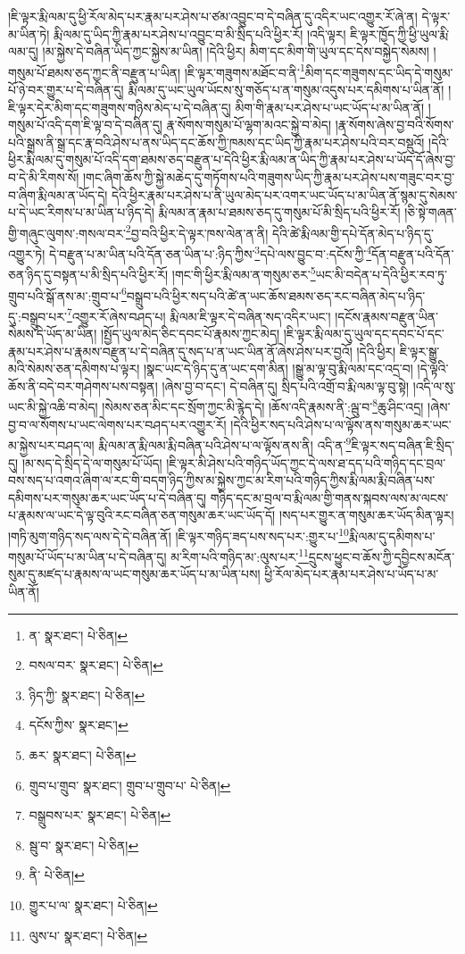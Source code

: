 །ཇི་ལྟར་རྨི་ལམ་དུ་ཕྱི་རོལ་མེད་པར་རྣམ་པར་ཤེས་པ་ཙམ་འབྱུང་བ་དེ་བཞིན་དུ་འདིར་ཡང་འགྱུར་རོ་ཞེ་ན། དེ་ལྟར་མ་ཡིན་ཏེ། རྨི་ལམ་དུ་ཡིད་ཀྱི་རྣམ་པར་ཤེས་པ་འབྱུང་བ་མི་སྲིད་པའི་ཕྱིར་རོ། །འདི་ལྟར། ཇི་ལྟར་ཁྱོད་ཀྱི་ཕྱི་ཡུལ་རྨི་ལམ་དུ། །མ་སྐྱེས་དེ་བཞིན་ཡིད་ཀྱང་སྐྱེས་མ་ཡིན། །དེའི་ཕྱིར། མིག་དང་མིག་གི་ཡུལ་དང་དེས་བསྐྱེད་སེམས། །
གསུམ་པོ་ཐམས་ཅད་ཀྱང་ནི་བརྫུན་པ་ཡིན། །ཇི་ལྟར་གཟུགས་མཐོང་བ་ནི་\footnote{ན་  སྣར་ཐང་།  པེ་ཅིན། }མིག་དང་གཟུགས་དང་ཡིད་དེ་གསུམ་པོ་ཉེ་བར་གྱུར་པ་དེ་བཞིན་དུ། རྨི་ལམ་དུ་ཡང་ཡུལ་ཡོངས་སུ་གཅོད་པ་ན་གསུམ་འདུས་པར་དམིགས་པ་ཡིན་ནོ། །ཇི་ལྟར་དེར་མིག་དང་གཟུགས་གཉིས་མེད་པ་དེ་བཞིན་དུ། མིག་གི་རྣམ་པར་ཤེས་པ་ཡང་ཡོད་པ་མ་ཡིན་ནོ། །གསུམ་པོ་འདི་དག་ཇི་ལྟ་བ་དེ་བཞིན་དུ། རྣ་སོགས་གསུམ་པོ་ལྷག་མའང་སྐྱེ་བ་མེད། །རྣ་སོགས་ཞེས་བྱ་བའི་སོགས་པའི་སྒྲས་ནི་སྒྲ་དང་རྣ་བའི་ཤེས་པ་ནས་ཡིད་དང་ཆོས་ཀྱི་ཁམས་དང་ཡིད་ཀྱི་རྣམ་པར་ཤེས་པའི་བར་བསྡུའོ། །དེའི་ཕྱིར་རྨི་ལམ་དུ་གསུམ་པོ་འདི་དག་ཐམས་ཅད་བརྫུན་པ་དེའི་ཕྱིར་རྨི་ལམ་ན་ཡིད་ཀྱི་རྣམ་པར་ཤེས་པ་ཡོད་དོ་ཞེས་བྱ་བ་དེ་མི་རིགས་སོ། །གང་ཞིག་ཆོས་ཀྱི་སྐྱེ་མཆེད་དུ་གཏོགས་པའི་གཟུགས་ཡིད་ཀྱི་རྣམ་པར་ཤེས་པས་གཟུང་བར་བྱ་བ་ཞིག་རྨི་ལམ་ན་ཡོད་དེ། དེའི་ཕྱིར་རྣམ་པར་ཤེས་པ་ནི་ཡུལ་མེད་པར་འགར་ཡང་ཡོད་པ་མ་ཡིན་ནོ་སྙམ་དུ་སེམས་པ་དེ་ཡང་རིགས་པ་མ་ཡིན་པ་ཉིད་དེ། རྨི་ལམ་ན་རྣམ་པ་ཐམས་ཅད་དུ་གསུམ་པོ་མི་སྲིད་པའི་ཕྱིར་རོ། །ཅི་སྟེ་གཞན་གྱི་གཞུང་ལུགས་:གསལ་བར་\footnote{བསལ་བར་  སྣར་ཐང་།  པེ་ཅིན། }བྱ་བའི་ཕྱིར་དེ་ལྟར་ཁས་ལེན་ན་ནི། དེའི་ཚེ་རྨི་ལམ་གྱི་དཔེ་དོན་མེད་པ་ཉིད་དུ་འགྱུར་ཏེ། དེ་བརྫུན་པ་མ་ཡིན་པའི་དོན་ཅན་ཡིན་པ་:ཉིད་ཀྱིས་\footnote{ཉིད་ཀྱི་  སྣར་ཐང་།  པེ་ཅིན། }དཔེ་ལས་བྱུང་བ་:དངོས་ཀྱི་\footnote{དངོས་ཀྱིས་  སྣར་ཐང་། }དོན་བརྫུན་པའི་དོན་ཅན་ཉིད་དུ་བསྟན་པ་མི་སྲིད་པའི་ཕྱིར་རོ། །གང་གི་ཕྱིར་རྨི་ལམ་ན་གསུམ་ཅར་\footnote{ཆར་  སྣར་ཐང་།  པེ་ཅིན། }ཡང་མི་བདེན་པ་དེའི་ཕྱིར་རབ་ཏུ་གྲུབ་པའི་སྒོ་ནས་མ་:གྲུབ་པ་\footnote{གྲུབ་པ་གྲུབ་  སྣར་ཐང་། གྲུབ་པ་གྲུབ་པ་  པེ་ཅིན། }བསྒྲུབ་པའི་ཕྱིར་སད་པའི་ཚེ་ན་ཡང་ཆོས་ཐམས་ཅད་རང་བཞིན་མེད་པ་ཉིད་དུ་:བསྒྲུབ་པར་\footnote{བསྒྲུབས་པར་  སྣར་ཐང་།  པེ་ཅིན། }འགྱུར་རོ་ཞེས་བཤད་པ། རྨི་ལམ་ཇི་ལྟར་དེ་བཞིན་སད་འདིར་ཡང་། །དངོས་རྣམས་བརྫུན་ཡིན་སེམས་དེ་ཡོད་མ་ཡིན། །སྤྱོད་ཡུལ་མེད་ཅིང་དབང་པོ་རྣམས་ཀྱང་མེད། །ཇི་ལྟར་རྨི་ལམ་དུ་ཡུལ་དང་དབང་པོ་དང་རྣམ་པར་ཤེས་པ་རྣམས་བརྫུན་པ་དེ་བཞིན་དུ་སད་པ་ན་ཡང་ཡིན་ནོ་ཞེས་ཤེས་པར་བྱའོ། །དེའི་ཕྱིར། ཇི་ལྟར་སྒྱུ་མའི་སེམས་ཅན་དམིགས་པ་ལྟར། །སྣང་ཡང་དེ་ཉིད་དུ་ན་ཡང་དག་མིན། །སྒྱུ་མ་ལྟ་བུ་རྨི་ལམ་དང་འདྲ་བ། །དེ་ལྟའི་ཆོས་ནི་བདེ་བར་གཤེགས་པས་བསྟན། །ཞེས་བྱ་བ་དང་། དེ་བཞིན་དུ། སྲིད་པའི་འགྲོ་བ་རྨི་ལམ་ལྟ་བུ་སྟེ། །འདི་ལ་སུ་ཡང་མི་སྐྱེ་འཆི་བ་མེད། །སེམས་ཅན་མིང་དང་སྲོག་ཀྱང་མི་རྙེད་དེ། །ཆོས་འདི་རྣམས་ནི་:ལྦུ་བ་\footnote{སྦུ་བ་  སྣར་ཐང་།  པེ་ཅིན། }ཆུ་ཤིང་འདྲ། །ཞེས་བྱ་བ་ལ་སོགས་པ་ཡང་ལེགས་པར་བཤད་པར་འགྱུར་རོ། །དེའི་ཕྱིར་སད་པའི་ཤེས་པ་ལ་ལྟོས་ནས་གསུམ་ཆར་ཡང་མ་སྐྱེས་པར་བཤད་ལ། རྨི་ལམ་ན་རྨི་ལམ་རྨི་བཞིན་པའི་ཤེས་པ་ལ་ལྟོས་ནས་ནི། འདི་ན་\footnote{ནི་  པེ་ཅིན། }ཇི་ལྟར་སད་བཞིན་ཇི་སྲིད་དུ། །མ་སད་དེ་སྲིད་དེ་ལ་གསུམ་པོ་ཡོད། །ཇི་ལྟར་མི་ཤེས་པའི་གཉིད་ཡོད་ཀྱང་དེ་ལས་ཐ་དད་པའི་གཉིད་དང་བྲལ་བས་སད་པ་འགའ་ཞིག་ལ་རང་གི་བདག་ཉིད་ཀྱིས་མ་སྐྱེས་ཀྱང་མ་རིག་པའི་གཉིད་ཀྱིས་རྨི་ལམ་རྨི་བཞིན་པས་དམིགས་པར་གསུམ་ཆར་ཡང་ཡོད་པ་དེ་བཞིན་དུ། གཉིད་དང་མ་བྲལ་བ་རྨི་ལམ་གྱི་གནས་སྐབས་ལས་མ་ལངས་པ་རྣམས་ལ་ཡང་དེ་ལྟ་བུའི་རང་བཞིན་ཅན་གསུམ་ཆར་ཡང་ཡོད་དོ། །སད་པར་གྱུར་ན་གསུམ་ཆར་ཡོད་མིན་ལྟར། །གཏི་མུག་གཉིད་སད་ལས་དེ་དེ་བཞིན་ནོ། །ཇི་ལྟར་གཉིད་ཟད་པས་སད་པར་:གྱུར་པ་\footnote{གྱུར་པ་ལ་  སྣར་ཐང་།  པེ་ཅིན། }རྨི་ལམ་དུ་དམིགས་པ་གསུམ་པོ་ཡོད་པ་མ་ཡིན་པ་དེ་བཞིན་དུ། མ་རིག་པའི་གཉིད་མ་:ལུས་པར་\footnote{ལུས་པ་  སྣར་ཐང་།  པེ་ཅིན། }དྲུངས་ཕྱུང་བ་ཆོས་ཀྱི་དབྱིངས་མངོན་སུམ་དུ་མཛད་པ་རྣམས་ལ་ཡང་གསུམ་ཆར་ཡོད་པ་མ་ཡིན་པས། ཕྱི་རོལ་མེད་པར་རྣམ་པར་ཤེས་པ་ཡོད་པ་མ་ཡིན་ནོ། 